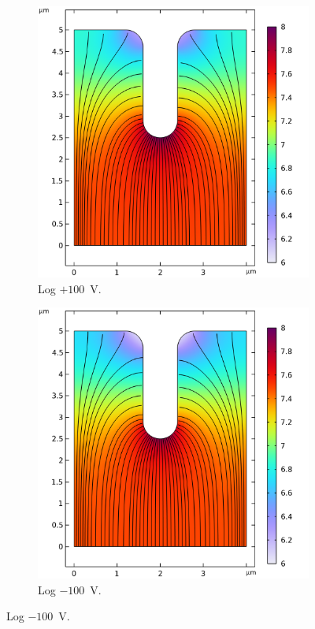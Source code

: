 \begin{refsection}
\begin{figure}[H]
    \begin{subfigure}[b]{0.45\linewidth}
        \includegraphics[width=\linewidth]{Chapter7/Figs/Raster/Comsol/+100_lognormE_smol.png}
        \caption{Log $+100$~\si{\volt}.}
        \label{fig:c_+100_log_norme}
    \end{subfigure}
    \hfill %
    \begin{subfigure}[b]{0.45\linewidth}
        \includegraphics[width=\linewidth]{Chapter7/Figs/Raster/Comsol/-100_lognormE_smol.png}
        \caption{Log $-100$~\si{\volt}.}
        \label{fig:c_-100_log_norme}
    \end{subfigure}
    

\end{figure}
\end{refsection}
